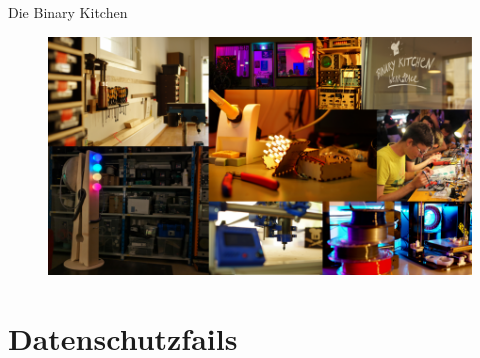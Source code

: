 \documentclass[10pt]{beamer}
\begin{document}
%
%
\begin{frame}[fragile]{Die Binary Kitchen}
	\begin{figure}
		\includegraphics[width=1\textwidth]{images/bkcollage}
	\end{figure}


\end{frame}

\section{Datenschutzfails}
\end{document}
